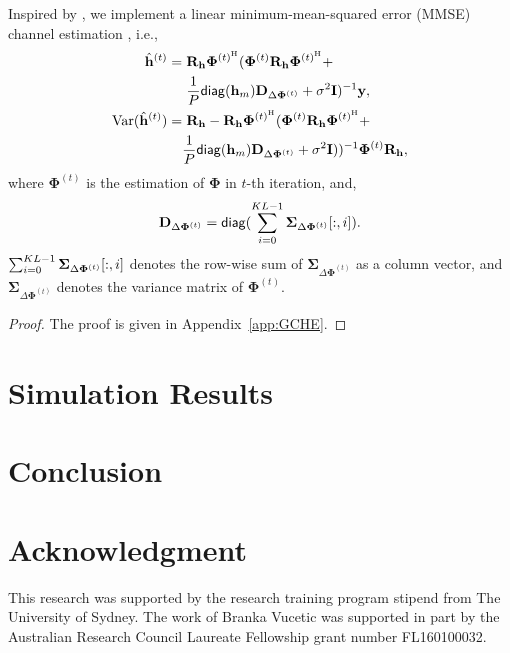 \documentclass[journal]{IEEEtran}
\newcommand{\HT}{^{\mathrm{H}}} %
\newcommand{\diag}{{\sf diag}} %
\begin{document}
Inspired by \cite{945004, 5493831}, we implement a linear minimum-mean-squared
error (MMSE) channel estimation , i.e.,
\begin{subequations}
\begin{align}
\hat{\mathbf h}^{(t)} = & \hspace{0.3em} \mathbf R_{\mathbf h}\mathbf\Phi^{(t)\HT}(\mathbf \Phi^{(t)}\mathbf R_{\mathbf h}\mathbf\Phi^{(t)\HT}\mathbf + \notag \\
& \hspace{0.3em} \frac{1}{P} \diag(\mathbf h_m) \mathbf D_{\Delta \bm\Phi^{(t)}} +\sigma^2\mathbf I)^{-1}\mathbf y, \label{eq:GCHE-mean} \\
\text{Var}(\hat{\mathbf h}^{(t)}) = & \hspace{0.3em} \mathbf R_{\mathbf h} - \mathbf R_{\mathbf h}\bm\Phi^{(t)\HT} (\bm\Phi^{(t)} \mathbf R_{\mathbf h} \bm\Phi^{(t)\HT} + \notag\\
\hspace{0.3em}& \frac{1}{P} \diag(\mathbf h_m) \mathbf D_{\Delta \bm\Phi^{(t)}} +\sigma^2\mathbf I))^{-1} \bm\Phi^{(t)}\mathbf R_{\mathbf h} \label{eq:GCHE-var},
\end{align}
\end{subequations}
where $\bm\Phi^{(t)}$ is the estimation of $\bm\Phi$ in $t$-th iteration, and,
\begin{equation}
\mathbf D_{\Delta \bm\Phi^{(t)}} = \diag(\sum_{i=0}^{KL-1} \bm\Sigma_{\Delta \bm\Phi^{(t)}}[:, i]).
\end{equation}
$\sum_{i=0}^{\smash{KL-1}}\boldsymbol{\Sigma}_{\Delta\boldsymbol{\Phi}^{(t)}}[:, i]$ denotes the row-wise sum of $\bm\Sigma_{\Delta\bm\Phi^{(t)}}$ as a column vector, and $\bm\Sigma_{\Delta\bm\Phi^{(t)}}$ denotes the variance matrix of $\bm\Phi^{(t)}$.

\begin{proof}
The proof is given in Appendix~\ref{app:GCHE}.
\end{proof}

\section{Simulation Results}

\section{Conclusion}

\section{Acknowledgment}
This research was supported by the research training program stipend from The University of Sydney. The work of Branka Vucetic was supported in part by the Australian Research Council Laureate Fellowship grant number FL160100032.
\end{document}
